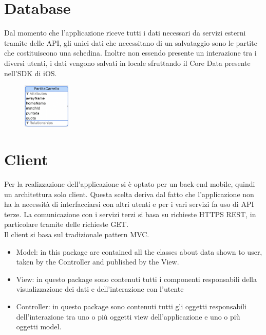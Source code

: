 \documentclass[numbers=noenddot, 12pt, a4paper, oneside]{scrbook}
\begin{document}
\section{Database}
Dal momento che l'applicazione riceve tutti i dati necessari da servizi esterni tramite delle API, gli unici dati che necessitano di un salvataggio sono le partite che costituiscono una schedina. Inoltre non essendo presente un interazione tra i diversi utenti, i dati vengono salvati in locale sfruttando il Core Data presente nell'SDK di iOS.
\begin{figure}[H]
	\centering
	\includegraphics[width=0.2\textwidth]{images/DatiSchedina}
\end{figure}

\section{Client}
Per la realizzazione dell'applicazione si è optato per un back-end mobile, quindi un architettura solo client. Questa scelta deriva dal fatto che l'applicazione non ha la necessità di interfacciarsi con altri utenti e per i vari servizi fa uso di API terze. La comunicazione con i servizi terzi si basa su richieste HTTPS REST, in particolare tramite delle richieste GET.\\
Il client si basa sul tradizionale pattern MVC.
\begin{itemize}
	\item Model: in this package are contained all the classes about data shown to user, taken by the Controller and published by the View.
	\item View: in questo package sono contenuti tutti i componenti responsabili della visualizzazione dei dati e dell'interazione con l'utente
	\item Controller: in questo package sono contenuti tutti gli oggetti responsabili dell'interazione tra uno o più oggetti view dell'applicazione e uno o più oggetti model.
\end{itemize}
\end{document}
